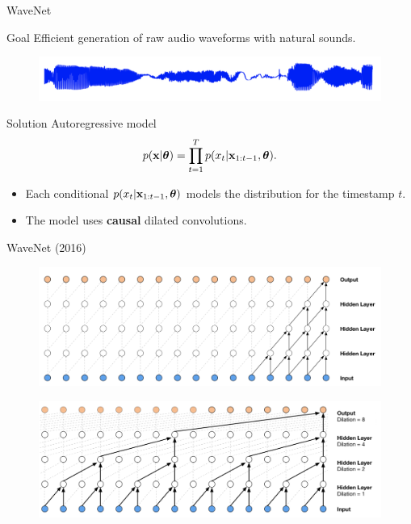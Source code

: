 \begin{frame}{WaveNet}
	\begin{block}{Goal}
	Efficient generation of raw audio waveforms with natural sounds.
	\end{block}
	\begin{figure}
	  \centering
	  \includegraphics[width=0.9\linewidth]{figs/wavenet_ex.png}
	\end{figure}
	\begin{block}{Solution}
		Autoregressive model
		\vspace{-0.3cm}
		\[
		    p(\mathbf{x}| \boldsymbol{\theta}) = \prod_{t=1}^T p(x_t|\mathbf{x}_{1:t-1}, \boldsymbol{\theta}).
		\]
		\vspace{-0.3cm}
	\end{block}
	\begin{itemize}
		\item Each conditional $p(x_t|\mathbf{x}_{1:t-1}, \boldsymbol{\theta})$ models the distribution for the timestamp $t$.
		\item The model uses \textbf{causal} dilated convolutions.
	\end{itemize}
\end{frame}
\begin{frame}{WaveNet (2016)}
	\begin{figure}
	    \centering
	    \includegraphics[width=0.9\linewidth]{figs/wavenet1.png}
	\end{figure}
	
	\begin{figure}
	    \centering
	    \includegraphics[width=0.9\linewidth]{figs/wavenet2.png}
	\end{figure}
\end{frame}
